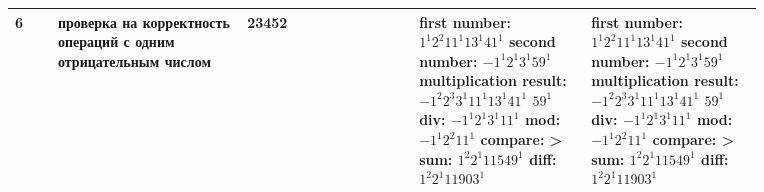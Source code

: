 \begin{table}[htbp]
\begin{tabular}{|p{0.05\linewidth}|p{0.22\linewidth}|p{0.2\linewidth}|p{0.2\linewidth}|p{0.2\linewidth}|}
		\textbf{6} 
		& проверка на корректность операций с одним отрицательным числом
		& 23452 \newline -354
		& first number: $1^1 2^2 11^1 13^1 41^1$ \newline
		second number: $- 1^1 2^1 3^1 59^1$ \newline
		multiplication result: $- 1^2 2^3 3^1 11^1 13^1 41^1$ \newline $59^1$ \newline
		div: $- 1^1 2^1 3^1 11^1$ \newline
		mod: $- 1^1 2^2 11^1$ \newline
		compare: > \newline
		sum: $1^2 2^1 11549^1$ \newline
		diff: $1^2 2^1 11903^1$ \newline
		& first number: $1^1 2^2 11^1 13^1 41^1$ \newline
		second number: $- 1^1 2^1 3^1 59^1$ \newline
		multiplication result: $- 1^2 2^3 3^1 11^1 13^1 41^1$ \newline $59^1$ \newline
		div: $- 1^1 2^1 3^1 11^1$ \newline
		mod: $- 1^1 2^2 11^1$ \newline
		compare: > \newline
		sum: $1^2 2^1 11549^1$ \newline
		diff: $1^2 2^1 11903^1$ \newline\\
		\hline
	\end{tabular}
	\label{tab:tests2}
\end{table}
\clearpage
